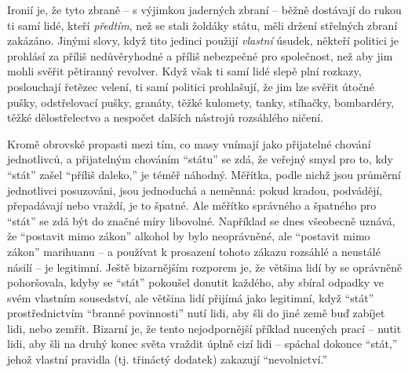 \documentclass{book}
\begin{document}
Ironií je, že tyto zbraně -- s výjimkou jaderných zbraní -- běžně dostávají do rukou ti samí lidé, kteří \emph{předtím}, než se stali žoldáky státu, měli držení střelných zbraní zakázáno. Jinými slovy, když tito jedinci použijí \emph{vlastní} úsudek, někteří politici je prohlásí za příliš nedůvěryhodné a příliš nebezpečné pro společnost, než aby jim mohli svěřit pětiranný revolver. Když však ti samí lidé slepě plní rozkazy, poslouchají řetězec velení, ti samí politici prohlašují, že jim lze svěřit útočné pušky, odstřelovací pušky, granáty, těžké kulomety, tanky, stíhačky, bombardéry, těžké dělostřelectvo a nespočet dalších nástrojů rozsáhlého ničení.

Kromě obrovské propasti mezi tím, co masy vnímají jako přijatelné chování jednotlivců, a přijatelným chováním \enquote{státu} se zdá, že veřejný smysl pro to, kdy \enquote{stát} zašel \enquote{příliš daleko,} je téměř náhodný. Měřítka, podle nichž jsou průměrní jednotlivci posuzováni, jsou jednoduchá a neměnná: pokud kradou, podvádějí, přepadávají nebo vraždí, je to špatné. Ale měřítko správného a špatného pro \enquote{stát} se zdá být do značné míry libovolné. Například se dnes všeobecně uznává, že \enquote{postavit mimo zákon} alkohol by bylo neoprávněné, ale \enquote{postavit mimo zákon} marihuanu -- a používat k prosazení tohoto zákazu rozsáhlé a neustálé násilí -- je legitimní. Ještě bizarnějším rozporem je, že většina lidí by se oprávněně pohoršovala, kdyby se \enquote{stát} pokoušel donutit každého, aby sbíral odpadky ve svém vlastním sousedství, ale většina lidí přijímá jako legitimní, když \enquote{stát} prostřednictvím \enquote{branné povinnosti} nutí lidi, aby šli do jiné země buď zabíjet lidi, nebo zemřít. Bizarní je, že tento nejodpornější příklad nucených prací -- nutit lidi, aby šli na druhý konec světa vraždit úplně cizí lidi -- spáchal dokonce \enquote{stát,} jehož vlastní pravidla (tj. třináctý dodatek) zakazují \enquote{nevolnictví.}
\end{document}
